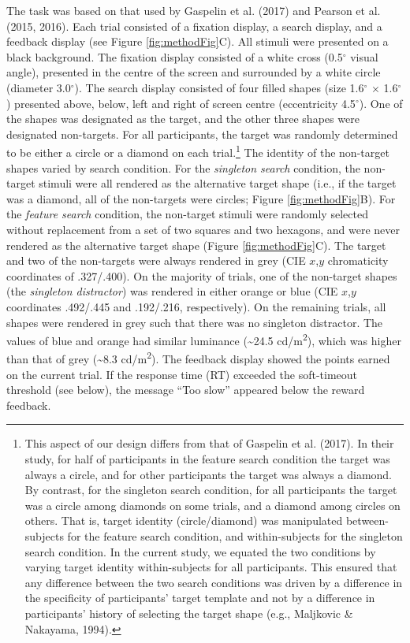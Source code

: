 \documentclass[jou, a4paper, noextraspace,floatsintext]{apa6}
\let\rmarkdownfootnote\footnote%
\def\footnote{\protect\rmarkdownfootnote}
\theoremstyle{definition}
\theoremstyle{definition}
\theoremstyle{definition}
\theoremstyle{remark}
\begin{document}
The task was based on that used by Gaspelin et al. (2017) and Pearson et
al. (2015, 2016). Each trial consisted of a fixation display, a search
display, and a feedback display (see Figure \ref{fig:methodFig}C). All
stimuli were presented on a black background. The fixation display
consisted of a white cross (0.5\(^\circ\) visual angle), presented in
the centre of the screen and surrounded by a white circle (diameter
3.0\(^\circ\)). The search display consisted of four filled shapes (size
1.6\(^\circ\) \(\times\) 1.6\(^\circ\)) presented above, below, left and
right of screen centre (eccentricity 4.5\(^\circ\)). One of the shapes
was designated as the target, and the other three shapes were designated
non-targets. For all participants, the target was randomly determined to
be either a circle or a diamond on each trial.\footnote{This aspect of
  our design differs from that of Gaspelin et al. (2017). In their
  study, for half of participants in the feature search condition the
  target was always a circle, and for other participants the target was
  always a diamond. By contrast, for the singleton search condition, for
  all participants the target was a circle among diamonds on some
  trials, and a diamond among circles on others. That is, target
  identity (circle/diamond) was manipulated between-subjects for the
  feature search condition, and within-subjects for the singleton search
  condition. In the current study, we equated the two conditions by
  varying target identity within-subjects for all participants. This
  ensured that any difference between the two search conditions was
  driven by a difference in the specificity of participants' target
  template and not by a difference in participants' history of selecting
  the target shape (e.g., Maljkovic \& Nakayama, 1994).} The identity of
the non-target shapes varied by search condition. For the
\emph{singleton search} condition, the non-target stimuli were all
rendered as the alternative target shape (i.e., if the target was a
diamond, all of the non-targets were circles; Figure
\ref{fig:methodFig}B). For the \emph{feature search} condition, the
non-target stimuli were randomly selected without replacement from a set
of two squares and two hexagons, and were never rendered as the
alternative target shape (Figure \ref{fig:methodFig}C). The target and
two of the non-targets were always rendered in grey (CIE \(x\),\(y\)
chromaticity coordinates of .327/.400). On the majority of trials, one
of the non-target shapes (the \emph{singleton distractor}) was rendered
in either orange or blue (CIE \(x\),\(y\) coordinates .492/.445 and
.192/.216, respectively). On the remaining trials, all shapes were
rendered in grey such that there was no singleton distractor. The values
of blue and orange had similar luminance (\textasciitilde{}24.5
cd/m\textsuperscript{2}), which was higher than that of grey
(\textasciitilde{}8.3 cd/m\textsuperscript{2}). The feedback display
showed the points earned on the current trial. If the response time (RT)
exceeded the soft-timeout threshold (see below), the message
\enquote{Too slow} appeared below the reward feedback.
\end{document}
